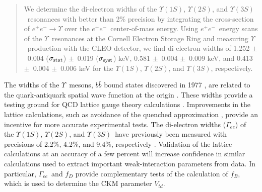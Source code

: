 \documentclass[aps,prd,preprint,superscriptaddress,tightenlines,nofootinbib]{revtex4}
\begin{document}

\date{December 21, 2005}

\newcommand{\gee}{$\Gamma_{ee}$}
\newcommand{\ups}{$\Upsilon$}
\newcommand{\us}{$\Upsilon(1S)$}
\newcommand{\uss}{$\Upsilon(2S)$}
\newcommand{\usss}{$\Upsilon(3S)$}
\newcommand{\ee}{$e^+e^-$}
\newcommand{\mm}{$\mu^+\mu^-$}
\newcommand{\tautau}{$\tau^+\tau^-$}
\newcommand{\ellell}{$\ell^+\ell^-$}
\newcommand{\pipi}{$\pi^+\pi^-$}
\newcommand{\PM}{$\pm$}
\newcommand{\inv}{$^{-1}$}
\newcommand{\bmm}{${\mathcal B}_{\mu\mu}$}
\newcommand{\btt}{${\mathcal B}_{\tau\tau}$}
\newcommand{\geehadtot}{\Gamma_{ee}\Gamma_{\mbox{\scriptsize had}}/\Gamma_{\mbox{\scriptsize tot}}}
\newcommand{\pvis}{P_{\mbox{\scriptsize vis}}}
\newcommand{\ppass}{P_{\mbox{\scriptsize pass given vis}}}
\newcommand{\ehtrig}{\epsilon_{\mbox{\scriptsize htrig}}}
\newcommand{\ecuts}{\epsilon_{\mbox{\scriptsize cuts}}}
\newcommand{\chired}{\chi^2_{\mbox{\scriptsize red}}}

\begin{abstract} 
We determine the di-electron widths of the \us, \uss, and \usss\
resonances with better than 2\% precision by integrating the
cross-section of $e^+e^- \to \Upsilon$ over the \ee\ center-of-mass
energy.  Using \ee\ energy scans of the \ups\ resonances at the
Cornell Electron Storage Ring and measuring \ups\ production with the
CLEO detector, we find di-electron widths of
%
1.252 \PM\ 0.004 ($\sigma_{\mbox{\scriptsize stat}}$) \PM\ 0.019 ($\sigma_{\mbox{\scriptsize syst}}$) keV,
0.581 \PM\ 0.004 \PM\ 0.009 keV, and
0.413 \PM\ 0.004 \PM\ 0.006 keV for the \us, \uss, and \usss,
respectively.
\end{abstract}

\maketitle

The widths of the \ups\ mesons, $b\bar{b}$ bound states discovered in
1977 \cite{discovery}, are related to the quark-antiquark spatial wave
function at the origin \cite{wavefunction}.  These widths provide a
testing ground for QCD lattice gauge theory calculations
\cite{lattice}.  Improvements in the lattice calculations, such as
avoidance of the quenched approximation \cite{unquenched}, provide an
incentive for more accurate experimental tests.  The di-electron
widths (\gee) of the \us, \uss, and \usss\ have previously been
measured with precisions of 2.2\%, 4.2\%, and 9.4\%, respectively
\cite{pdg}.  Validation of the lattice calculations at an accuracy of
a few percent will increase confidence in similar calculations used to
extract important weak-interaction parameters from data.  In
particular, \gee\ and $f_D$ \cite{fd} provide complementary tests of
the calculation of $f_B$, which is used to determine the CKM parameter
$V_{td}$.
\end{document}
